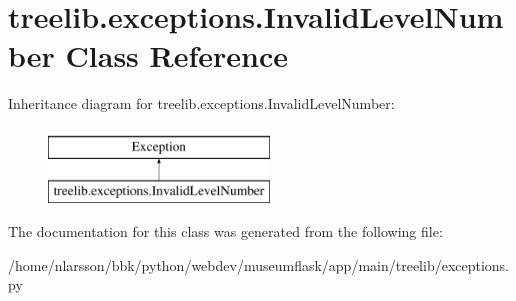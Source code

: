 \hypertarget{classtreelib_1_1exceptions_1_1InvalidLevelNumber}{}\section{treelib.\+exceptions.\+Invalid\+Level\+Number Class Reference}
\label{classtreelib_1_1exceptions_1_1InvalidLevelNumber}
Inheritance diagram for treelib.\+exceptions.\+Invalid\+Level\+Number\+:\begin{figure}[H]
\begin{center}
\leavevmode
\includegraphics[height=2.000000cm]{classtreelib_1_1exceptions_1_1InvalidLevelNumber}
\end{center}
\end{figure}


The documentation for this class was generated from the following file\+:\begin{DoxyCompactItemize}
\item 
/home/nlarsson/bbk/python/webdev/museumflask/app/main/treelib/exceptions.\+py\end{DoxyCompactItemize}
